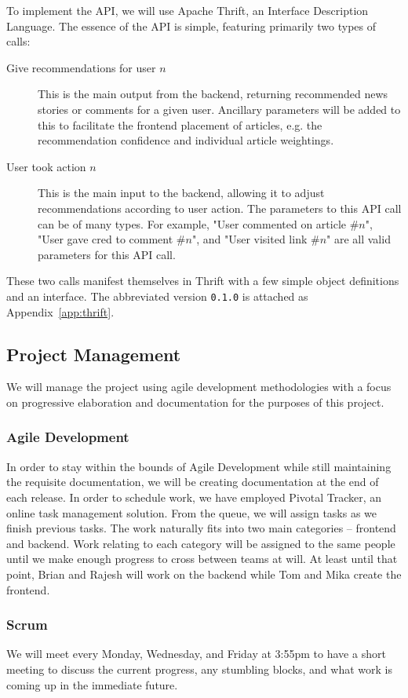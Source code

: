 \documentclass[11pt,letterpaper]{article}
\begin{document}
To implement the API, we will use Apache Thrift, an Interface Description Language\cite{thrift}.
The essence of the API is simple, featuring primarily two types of calls:
\begin{description}
\item[Give recommendations for user $n$]
This is the main output from the backend, returning recommended news stories or comments for a given user.
Ancillary parameters will be added to this to facilitate the frontend placement of articles, e.g. the recommendation confidence and individual article weightings.
\item[User took action $n$]
This is the main input to the backend, allowing it to adjust recommendations according to user action.
The parameters to this API call can be of many types. For example, "User commented on article \#$n$", "User gave cred to comment \#$n$", and "User visited link \#$n$" are all valid parameters for this API call.
\end{description}

These two calls manifest themselves in Thrift with a few simple object
definitions and an interface.  The abbreviated version \texttt{0.1.0} is
attached as Appendix~\ref{app:thrift}.

\subsection{Project Management}
We will manage the project using agile development methodologies with a focus on progressive elaboration and documentation for the purposes of this project.

\subsubsection{Agile Development}
In order to stay within the bounds of Agile Development while still maintaining the requisite documentation, we will be creating documentation at the end of each release.
In order to schedule work, we have employed Pivotal Tracker, an online task management solution.
From the queue, we will assign tasks as we finish previous tasks.
The work naturally fits into two main categories -- frontend and backend.
Work relating to each category will be assigned to the same people until we make enough progress to cross between teams at will.
At least until that point, Brian and Rajesh will work on the backend while Tom and Mika create the frontend.

\subsubsection{Scrum}
We will meet every Monday, Wednesday, and Friday at 3:55pm to have a short meeting to discuss the current progress, any stumbling blocks, and what work is coming up in the immediate future.
\end{document}
